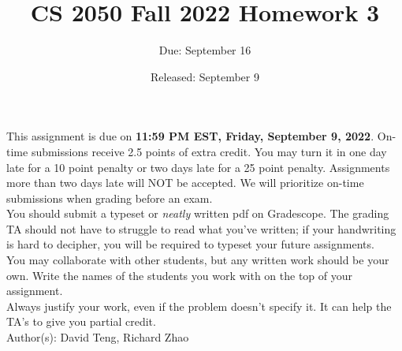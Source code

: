 \documentclass{article}
\title{CS 2050 Fall 2022 Homework 3}
\author{Due: September 16}
\date{Released: September 9}
\begin{document}
\maketitle

This assignment is due on \textbf{11:59 PM EST, Friday, September 9, 2022}.  On-time submissions receive 2.5 points of extra credit. You may turn it in one day late for a 10 point penalty or two days late for a 25 point penalty. Assignments more than two days late will NOT be accepted.  We will prioritize on-time submissions when grading before an exam. \\ 

You should submit a typeset or \emph{neatly} written pdf on Gradescope.  The grading TA should not have to struggle to read what you've written; if your handwriting is hard to decipher, you will be required to typeset your future assignments.\\ 

You may collaborate with other students, but any written work should be your own. Write the names of the students you work with on the top of your assignment.\\

Always justify your work, even if the problem doesn't specify it. It can help the TA's to give you partial credit.
\\

Author(s): David Teng, Richard Zhao

\clearpage
\end{document}
